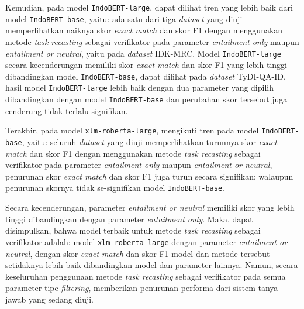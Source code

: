 Kemudian, pada model \texttt{IndoBERT-large}, dapat dilihat tren yang lebih baik dari model \texttt{IndoBERT-base}, yaitu: ada satu dari tiga \emph{dataset} yang diuji memperlihatkan naiknya skor \emph{exact match} dan skor F1 dengan menggunakan metode \emph{task recasting} sebagai verifikator pada parameter \emph{entailment only} maupun \emph{entailment or neutral}, yaitu pada \emph{dataset} IDK-MRC. Model \texttt{IndoBERT-large} secara kecenderungan memiliki skor \emph{exact match} dan skor F1 yang lebih tinggi dibandingkan model \texttt{IndoBERT-base}, dapat dilihat pada \emph{dataset} TyDI-QA-ID, hasil model \texttt{IndoBERT-large} lebih baik dengan dua parameter yang dipilih dibandingkan dengan model \texttt{IndoBERT-base} dan perubahan skor tersebut juga cenderung tidak terlalu signifikan.

Terakhir, pada model \texttt{xlm-roberta-large}, mengikuti tren pada model \texttt{IndoBERT-base}, yaitu: seluruh \emph{dataset} yang diuji memperlihatkan turunnya skor \emph{exact match} dan skor F1 dengan menggunakan metode \emph{task recasting} sebagai verifikator pada parameter \emph{entailment only} maupun \emph{entailment or neutral}, penurunan skor \emph{exact match} dan skor F1 juga turun secara signifikan; walaupun penurunan skornya tidak se-signifikan model \texttt{IndoBERT-base}.

Secara kecenderungan, parameter \emph{entailment or neutral} memiliki skor yang lebih tinggi dibandingkan dengan parameter \emph{entailment only}. Maka, dapat disimpulkan, bahwa model terbaik untuk metode \emph{task recasting} sebagai verifikator adalah: model \texttt{xlm-roberta-large} dengan parameter \emph{entailment or neutral}, dengan skor \emph{exact match} dan skor F1 model dan metode tersebut setidaknya lebih baik dibandingkan model dan parameter lainnya. Namun, secara keseluruhan penggunaan metode \emph{task recasting} sebagai verifikator pada semua parameter tipe \emph{filtering}, memberikan penurunan performa dari sistem tanya jawab yang sedang diuji.

